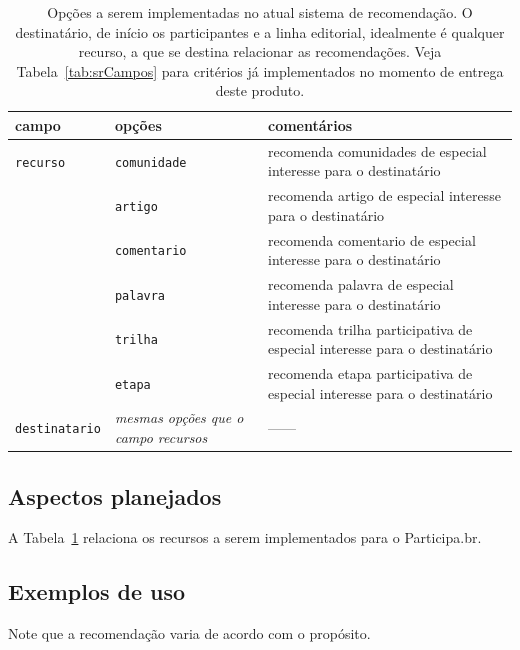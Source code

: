 \documentclass[12pt]{article}
\begin{document}
\begin{table}
\begin{center}
\begin{tabular}{|l|l|p{8cm}|}\hline
\textbf{campo} & \textbf{opções} & \textbf{comentários} \\\hline\hline
\texttt{recurso}       & \texttt{comunidade} & recomenda comunidades de especial interesse para o destinatário \\
                       & \texttt{artigo} & recomenda artigo de especial interesse para o destinatário               \\
                       & \texttt{comentario} & recomenda comentario de especial interesse para o destinatário               \\
                       & \texttt{palavra} & recomenda palavra de especial interesse para o destinatário               \\
                       & \texttt{trilha} & recomenda trilha participativa de especial interesse para o destinatário               \\
                       & \texttt{etapa} & recomenda etapa participativa de especial interesse para o destinatário               \\\hline
\texttt{destinatario}  & \emph{mesmas opções que o campo recursos} & ------    \\\hline
\end{tabular}
\caption[Table caption text]{Opções a serem implementadas no atual sistema de recomendação. O destinatário, de início os participantes e a linha editorial, idealmente é qualquer recurso, a que se destina relacionar as recomendações.
Veja Tabela~\ref{tab:srCampos} para critérios já implementados no momento de entrega deste produto.}
\label{tab:srCampos2}
\end{center}
\end{table}

\subsection{Aspectos planejados}\label{sec:plan}
A Tabela~\ref{tab:srCampos2} relaciona os recursos a serem implementados para o Participa.br.

\subsection{Exemplos de uso}
Note que a recomendação varia de acordo com o propósito.
\end{document}
